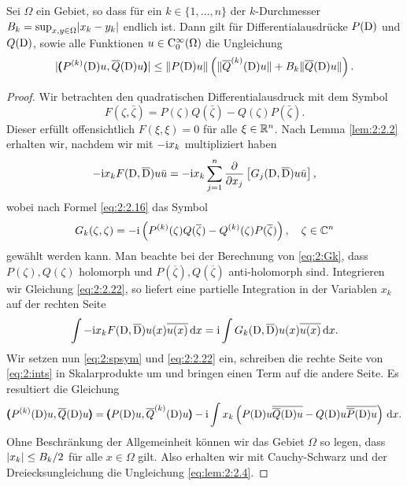 \begin{lem}
Sei $\Omega$ ein Gebiet, so dass für ein $k\in\{1,\ldots,n\}$ der $k$-Durchmesser $B_k=\sup_{x,y\in\Omega}\lvert x_k-y_k\rvert$ endlich ist. Dann gilt
für Differentialausdrücke $P(\mathrm D)$ und $Q(\mathrm D)$, sowie alle Funktionen $u\in\mathrm C_0^\infty(\Omega)$ die Ungleichung
\begin{equation}\label{eq:lem:2:2.4}
\lvert\pmb(P^{(k)}(\mathrm D)u,\overline{Q}(\mathrm D)u\pmb)\rvert\leq\lVert P(\mathrm D)u\rVert\left(\lVert\overline{Q}^{(k)}(\mathrm D)u\rVert+B_k\lVert\overline{Q}(\mathrm D)u\rVert\right).
\end{equation}
\end{lem}

\begin{proof}
Wir betrachten den quadratischen Differentialausdruck mit dem Symbol
\begin{equation}\label{eq:2:spsym}
F(\zeta,\bar{\zeta})=P(\zeta)Q(\bar{\zeta})-Q(\zeta)P(\bar{\zeta}).
\end{equation}
Dieser erfüllt offensichtlich $F(\xi,\xi)=0$ für alle $\xi\in\mathbb R^n$.
Nach Lemma \ref{lem:2:2.2} erhalten wir,
nachdem wir mit $-\mathrm i x_k$ multipliziert haben
\begin{equation}\label{eq:2:2.22}
-\mathrm i x_kF(\mathrm D,\overline{\mathrm D})u\bar{u}=-\mathrm i x_k\sum_{j=1}^n\frac{\partial}{\partial x_j}\left[G_j(\mathrm D,\overline{\mathrm D})u\bar{u}\right],
\end{equation}
wobei nach Formel \eqref{eq:2:2.16} das Symbol
\begin{equation}
G_k(\zeta,\zeta)=-\mathrm i\left(P^{(k)}(\zeta)Q(\overline{\zeta})-Q^{(k)}(\zeta)P(\overline{\zeta})\right)\label{eq:2:Gk},
\quad\zeta\in\mathbb C^n
\end{equation}
gewählt werden kann.
Man beachte bei der Berechnung von \eqref{eq:2:Gk},
dass $P(\zeta),Q(\zeta)$ holomorph
und $P(\overline{\zeta}),Q(\overline{\zeta})$ anti-holomorph sind.
Integrieren wir Gleichung \eqref{eq:2:2.22},
so liefert eine partielle Integration
in der Variablen $x_k$ auf der rechten Seite
\begin{equation}\label{eq:2:ints}
\int-\mathrm i x_kF(\mathrm D,\overline{\mathrm D})u(x)\overline{u(x)}\,\mathrm d x=\mathrm i\int G_k(\mathrm D,\overline{\mathrm D})u(x)\overline{u(x)}\,\mathrm d x.
\end{equation}
Wir setzen nun \eqref{eq:2:spsym} und \eqref{eq:2:2.22} ein,
schreiben die rechte Seite von \eqref{eq:2:ints}
in Skalarprodukte um und bringen einen Term auf die andere Seite.
Es resultiert die Gleichung
\begin{equation}
\pmb(P^{(k)}(\mathrm D)u,\overline{Q}(\mathrm D)u\pmb)
=\pmb(P(\mathrm D)u,\overline{Q}^{(k)}(\mathrm D)u\pmb)-\mathrm i\int x_k\left(P(\mathrm D)u\overline{\overline{Q}(\mathrm D)u}-Q(\mathrm D)u\overline{\overline{P}(\mathrm D)u}\right)\,\mathrm d x.
\end{equation}
Ohne Beschränkung der Allgemeinheit können wir das Gebiet $\Omega$ so legen,
dass $\lvert x_k\rvert\leq B_k/2$ für alle $x\in\Omega$ gilt.
Also erhalten wir mit Cauchy-Schwarz
und der Dreiecksungleichung die Ungleichung \eqref{eq:lem:2:2.4}.
\end{proof}

